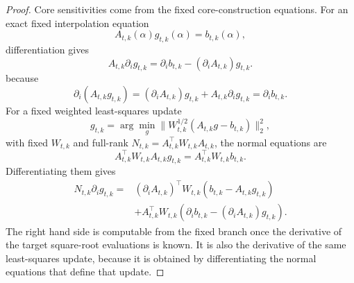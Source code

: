 \documentclass[11pt]{article}
\theoremstyle{definition}
\theoremstyle{remark}
\begin{document}
\begin{proof}
Core sensitivities come from the fixed core-construction equations.  For an
exact fixed interpolation equation
\[
  A_{t,k}(\alpha)g_{t,k}(\alpha)=b_{t,k}(\alpha),
  \label{eq:p12-fixed-interpolation}
\]
differentiation gives
\[
  A_{t,k}\partial_i g_{t,k}
  =
  \partial_i b_{t,k}
  -
  (\partial_i A_{t,k})g_{t,k}.
  \label{eq:p12-fixed-interpolation-derivative}
\]
because
\[
  \partial_i(A_{t,k}g_{t,k})
  =
  (\partial_iA_{t,k})g_{t,k}+A_{t,k}\partial_i g_{t,k}
  =
  \partial_i b_{t,k}.
\]
For a fixed weighted least-squares update
\[
  g_{t,k}
  =
  \arg\min_g
  \|W_{t,k}^{1/2}(A_{t,k}g-b_{t,k})\|_2^2,
\]
with fixed \(W_{t,k}\) and full-rank
\(N_{t,k}=A_{t,k}^\top W_{t,k}A_{t,k}\), the normal equations are
\[
  A_{t,k}^\top W_{t,k}A_{t,k}g_{t,k}
  =
  A_{t,k}^\top W_{t,k}b_{t,k}.
\]
Differentiating them gives
\[
\begin{aligned}
  N_{t,k}\partial_i g_{t,k}
  =
  &(\partial_i A_{t,k})^\top W_{t,k}
    (b_{t,k}-A_{t,k}g_{t,k})\\
  &+
  A_{t,k}^\top W_{t,k}
  (\partial_i b_{t,k}-(\partial_iA_{t,k})g_{t,k}).
  \label{eq:p12-ls-derivative}
\end{aligned}
\]
The right hand side is computable from the fixed branch once the derivative of
the target square-root evaluations is known.  It is also the derivative of the
same least-squares update, because it is obtained by differentiating the
normal equations that define that update.


\end{proof}
\end{document}
